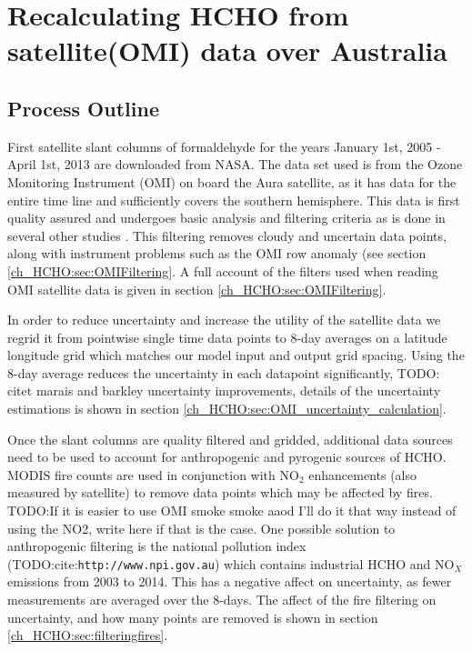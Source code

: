 \section{Recalculating HCHO from satellite(OMI) data over Australia}
\label{ch_HCHO:sec:creatinginventory}

  \subsection{Process Outline}
    First satellite slant columns of formaldehyde for the years January 1st, 2005 - April 1st, 2013 are downloaded from NASA.
    The data set used is from the Ozone Monitoring Instrument (OMI) on board the Aura satellite, as it has data for the entire time line and sufficiently covers the southern hemisphere.
    This data is first quality assured and undergoes basic analysis and filtering criteria as is done in several other studies \citep[eg.]{Marais2012, Barkley2013, Bauwens2016, Zhu2016}.
    This filtering removes cloudy and uncertain data points, along with instrument problems such as the OMI row anomaly (see section \ref{ch_HCHO:sec:OMIFiltering}.
    A full account of the filters used when reading OMI satellite data is given in section \ref{ch_HCHO:sec:OMIFiltering}.
    
    In order to reduce uncertainty and increase the utility of the satellite data we regrid it from pointwise single time data points to 8-day averages on a latitude longitude grid which matches our model input and output grid spacing. 
    Using the 8-day average reduces the uncertainty in each datapoint significantly, TODO: citet marais and barkley uncertainty improvements, details of the uncertainty estimations is shown in section \ref{ch_HCHO:sec:OMI_uncertainty_calculation}.
    
    Once the slant columns are quality filtered and gridded, additional data sources need to be used to account for anthropogenic and pyrogenic sources of HCHO.
    MODIS fire counts are used in conjunction with NO$_2$ enhancements (also measured by satellite) to remove data points which may be affected by fires. 
    TODO:If it is easier to use OMI smoke smoke aaod I'll do it that way instead of using the NO2, write here if that is the case.
    One possible solution to anthropogenic filtering is the national pollution index (TODO:cite:\verb|http://www.npi.gov.au|) which contains industrial HCHO and NO$_X$ emissions from 2003 to 2014.
    This has a negative affect on uncertainty, as fewer measurements are averaged over the 8-days. 
    The affect of the fire filtering on uncertainty, and how many points are removed is shown in section \ref{ch_HCHO:sec:filteringfires}.
    

